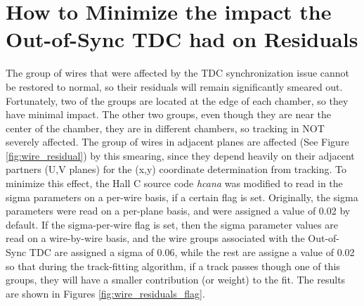 \documentclass[11pt]{article}
\begin{document}
\section{How to Minimize the impact the Out-of-Sync TDC had on Residuals }
\noindent The group of wires that were affected by the TDC synchronization issue cannot be restored to normal, so their residuals will remain significantly smeared out. Fortunately,
two of the groups are located at the edge of each chamber, so they have minimal impact. The other two groups, even though they are near the center of the chamber, they are
in different chambers, so tracking in NOT severely affected. The group of wires in adjacent planes are affected (See Figure \ref{fig:wire_residual}) by this smearing, since
they depend heavily on their adjacent partners (U,V planes) for the (x,y) coordinate determination from tracking. To minimize this effect, the Hall C source code \textit{hcana}
was modified to read in the sigma parameters on a per-wire basis, if a certain flag is set. Originally, the sigma parameters were read on a per-plane basis, and were assigned a
value of 0.02 by default. If the sigma-per-wire flag is set, then the sigma parameter values are read on a wire-by-wire basis, and the wire groups associated with the
Out-of-Sync TDC are assigned a sigma of 0.06, while the rest are assigne a value of 0.02 so that during the track-fitting algorithm, if a track passes though one of this groups,
they will have a smaller contribution (or weight) to the fit. The results are shown in Figures \ref{fig:wire_residuals_flag}.
\end{document}

